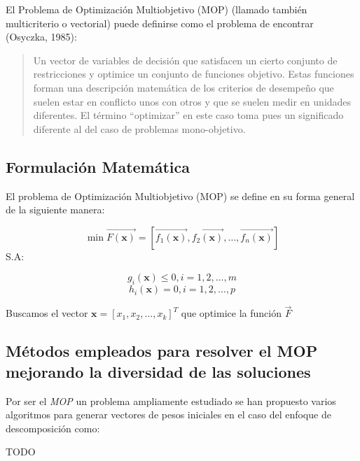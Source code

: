 \documentclass[letterpaper,10pt]{article}
\begin{document}
El Problema de Optimización Multiobjetivo (MOP) (llamado también
multicriterio o vectorial) puede definirse como el problema de
encontrar (Osyczka, 1985)\cite{Osyczka1985193}:
\begin{quote}
Un vector de variables de decisión que satisfacen un cierto
conjunto de restricciones y optimice un conjunto de funciones
objetivo. Estas funciones forman una descripción matemática
de los criterios de desempeño que suelen estar en conflicto
unos con otros y que se suelen medir en unidades diferentes.
El término ``optimizar'' en este caso toma pues un significado
diferente al del caso de problemas mono-objetivo.
\end{quote}

\subsection{Formulación Matemática}
El problema de Optimización Multiobjetivo (MOP) se define en su forma general de la siguiente manera:
 
$$\min \overrightarrow{F(\bm{x})} = \left[ \overrightarrow{f_1(\bm{x})}, \overrightarrow{f_2(\bm{x})} , \dots, \overrightarrow{f_n(\bm{x})} \right] $$
S.A:
 
$$g_i(\bm{x}) \leq 0, i=1,2,\dots,m$$
$$h_i(\bm{x}) = 0, i=1,2,\dots,p$$
 
Buscamos el vector $\bm{x}=[x_1,x_2,\dots,x_k]^T$ que optimice la función $\overrightarrow{F}$

\newpage
 
\subsection{Métodos empleados para resolver el MOP mejorando la diversidad de las soluciones}

Por ser el \emph{MOP} un problema ampliamente estudiado se han propuesto varios algoritmos para generar vectores de pesos iniciales en el caso del enfoque de descomposición como:
\newline

{\huge TODO}
\end{document}
